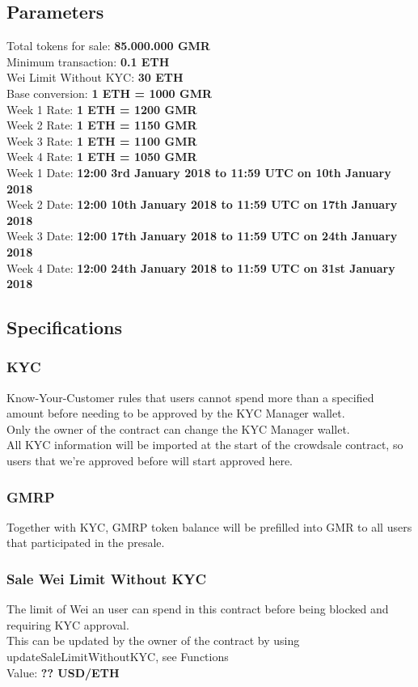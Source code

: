 \documentclass[11pt]{article} %
\begin{document}
\subsection{Parameters}
Total tokens for sale: \textbf{85.000.000 GMR}\\
Minimum transaction: \textbf{0.1 ETH}\\
Wei Limit Without KYC: \textbf{30 ETH}\\
Base conversion: \textbf{1 ETH = 1000 GMR}\\
Week 1 Rate: \textbf{1 ETH = 1200 GMR}\\
Week 2 Rate: \textbf{1 ETH = 1150 GMR}\\
Week 3 Rate: \textbf{1 ETH = 1100 GMR}\\
Week 4 Rate: \textbf{1 ETH = 1050 GMR}\\
Week 1 Date: \textbf{12:00 3rd January 2018 to 11:59 UTC on 10th January 2018}\\
Week 2 Date: \textbf{12:00 10th January 2018 to 11:59 UTC on 17th January 2018}\\
Week 3 Date: \textbf{12:00 17th January 2018 to 11:59 UTC on 24th January 2018}\\
Week 4 Date: \textbf{12:00 24th January 2018 to 11:59 UTC on 31st January 2018}\\

\subsection{Specifications}
\subsubsection{KYC}
Know-Your-Customer rules that users cannot spend more than a specified amount before needing to be approved by the KYC Manager wallet.\\
Only the owner of the contract can change the KYC Manager wallet.\\
All KYC information will be imported at the start of the crowdsale contract, so users that we're approved before will start approved here.

\subsubsection{GMRP}
Together with KYC, GMRP token balance will be prefilled into GMR to all users that participated in the presale.

\subsubsection{Sale Wei Limit Without KYC}
The limit of Wei an user can spend in this contract before being blocked and requiring KYC approval.\\
This can be updated by the owner of the contract by using updateSaleLimitWithoutKYC, see Functions\\
Value: \textbf{?? USD/ETH}\\
\end{document}
